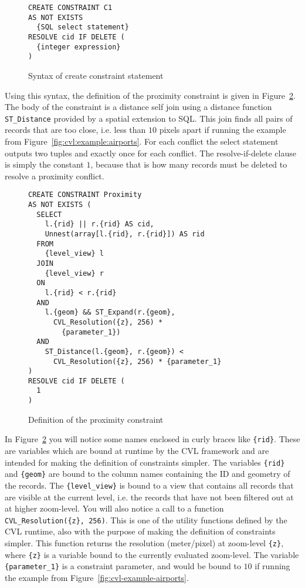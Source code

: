 \begin{figure}[htbp]
\begin{center}
\begin{lstlisting}
CREATE CONSTRAINT C1
AS NOT EXISTS
  {SQL select statement}
RESOLVE cid IF DELETE (
  {integer expression}
)
\end{lstlisting}
\caption{Syntax of create constraint statement}
\label{fig:create:constraint:syntax}
\end{center}
\end{figure}

Using this syntax, the definition of the proximity constraint is given in Figure~\ref{fig:proximity:definition}. The body of the constraint is a distance self join using a distance function \texttt{ST\_Distance} provided by a spatial extension to SQL. This join finds all pairs of records that are too close, i.e. less than $10$ pixels apart if running the example from Figure~\ref{fig:cvl:example:airports}. For each conflict the select statement outputs two tuples and exactly once for each conflict. The resolve-if-delete clause is simply the constant $1$, because that is how many records must be deleted to resolve a proximity conflict.

\begin{figure}[htbp]
\begin{center}
\begin{lstlisting}
CREATE CONSTRAINT Proximity
AS NOT EXISTS (
  SELECT 
    l.{rid} || r.{rid} AS cid,
    Unnest(array[l.{rid}, r.{rid}]) AS rid
  FROM
    {level_view} l
  JOIN
    {level_view} r
  ON
    l.{rid} < r.{rid}
  AND
    l.{geom} && ST_Expand(r.{geom}, 
      CVL_Resolution({z}, 256) * 
        {parameter_1})
  AND
    ST_Distance(l.{geom}, r.{geom}) <
      CVL_Resolution({z}, 256) * {parameter_1}
)
RESOLVE cid IF DELETE (
  1
)
\end{lstlisting}
\caption{Definition of the proximity constraint}
\label{fig:proximity:definition}
\end{center}
\end{figure}

In Figure~\ref{fig:proximity:definition} you will notice some names enclosed in curly braces like \texttt{\{rid\}}. These are variables which are bound at runtime by the CVL framework and are intended for making the definition of constraints simpler. The variables \texttt{\{rid\}} and \texttt{\{geom\}} are bound to the column names containing the ID and geometry of the records. The \texttt{\{level\_view\}} is bound to a view that contains all records that are visible at the current level, i.e. the records that have not been filtered out at at higher zoom-level. You will also notice a call to a function \texttt{CVL\_Resolution(\{z\}, 256)}. This is one of the utility functions defined by the CVL runtime, also with the purpose of making the definition of constraints simpler. This function returns the resolution (meter/pixel) at zoom-level \texttt{\{z\}}, where \texttt{\{z\}} is a variable bound to the currently evaluated zoom-level. The variable \texttt{\{parameter\_1\}} is a constraint parameter, and would be bound to $10$ if running the example from Figure~\ref{fig:cvl-example-airports}.

